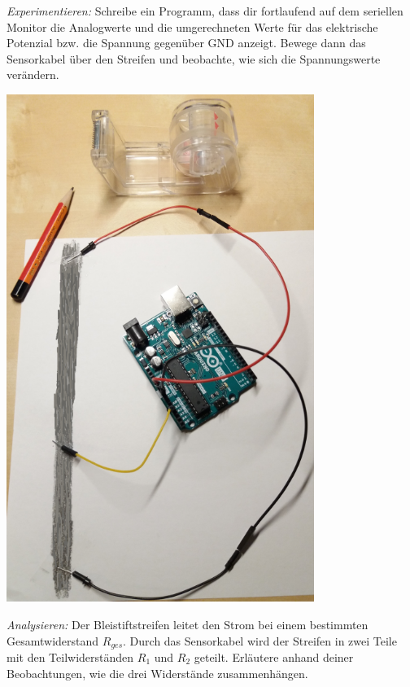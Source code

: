 \documentclass[ngerman, 11pt]{scrreprt}
\begin{document}
\begin{aufgabe*}
\begin{minipage}{0.6\textwidth}
			\bigskip
			\emph{Experimentieren:}	Schreibe ein Programm, dass dir fortlaufend auf dem seriellen Monitor die Analogwerte und die umgerechneten Werte für das elektrische Potenzial bzw. die Spannung gegenüber GND anzeigt. Bewege dann das Sensorkabel über den Streifen und beobachte, wie sich die Spannungswerte verändern.
		\end{minipage}
		\hfill
		\begin{minipage}{0.39\textwidth}
			\centering
			\includegraphics[width=0.75\textwidth]{../pics/bleistiftpoti-klein.png}
		\end{minipage}
		\par
		\bigskip
		\emph{Analysieren:}	Der Bleistiftstreifen leitet den Strom bei einem bestimmten Gesamtwiderstand $R_{ges}$. Durch das Sensorkabel wird der Streifen in zwei Teile mit den Teilwiderständen $R_1$ und $R_2$ geteilt. Erläutere anhand deiner Beobachtungen, wie die drei Widerstände zusammenhängen.
	\end{aufgabe*}
\end{document}
